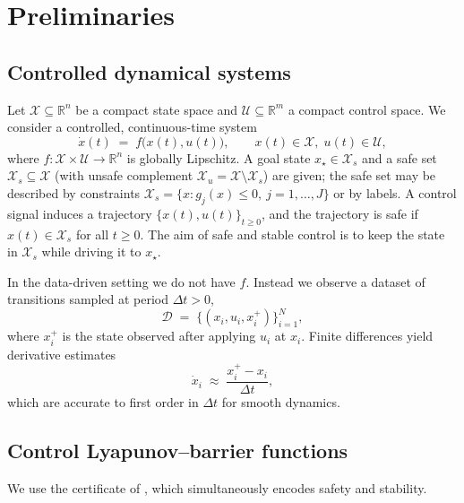 \documentclass{article}
\newcommand{\R}{\mathbb{R}}
\newcommand{\Xs}{\mathcal{X}_s}
\newcommand{\Xu}{\mathcal{X}_u}
\begin{document}
\section{Preliminaries}

\subsection{Controlled dynamical systems}

Let $\mathcal{X}\subseteq\R^n$ be a compact state space and
$\mathcal{U}\subseteq\R^m$ a compact control space. We consider a controlled,
continuous-time system
\begin{equation}
\label{eq:dynamics}
    \dot{x}(t) \;=\; f\bigl(x(t),u(t)\bigr),
    \qquad x(t)\in\mathcal{X},\; u(t)\in\mathcal{U},
\end{equation}
where $f:\mathcal{X}\times\mathcal{U}\to\R^n$ is globally Lipschitz. A goal state
$x_\star\in\Xs$ and a safe set $\Xs\subseteq\mathcal{X}$ (with unsafe complement
$\Xu=\mathcal{X}\setminus\Xs$) are given; the safe set may be described by
constraints $\Xs=\{x:g_j(x)\le 0,\ j=1,\dots,J\}$ or by labels. A control signal
induces a trajectory $\{x(t),u(t)\}_{t\ge 0}$, and the trajectory is safe if
$x(t)\in\Xs$ for all $t\ge 0$. The aim of safe and stable control is to keep the
state in $\Xs$ while driving it to $x_\star$.

In the data-driven setting we do not have $f$. Instead we observe a dataset of
transitions sampled at period $\Delta t>0$,
\begin{equation}
\label{eq:data}
    \mathcal{D} \;=\; \bigl\{(x_i,u_i,x_i^+)\bigr\}_{i=1}^N,
\end{equation}
where $x_i^+$ is the state observed after applying $u_i$ at $x_i$. Finite
differences yield derivative estimates
\begin{equation}
\label{eq:fd}
    \dot{x}_i \;\approx\; \frac{x_i^+ - x_i}{\Delta t},
\end{equation}
which are accurate to first order in $\Delta t$ for smooth dynamics.

\subsection{Control Lyapunov--barrier functions}

We use the certificate of \citet{cheng2026safe}, which simultaneously encodes
safety and stability.
\end{document}

